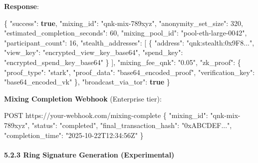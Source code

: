 \documentclass[
  11pt,
]{article}
\newenvironment{Shaded}{\begin{snugshade}}{\end{snugshade}}
\newcommand{\DataTypeTok}[1]{\textcolor[rgb]{0.13,0.29,0.53}{#1}}
\newcommand{\DecValTok}[1]{\textcolor[rgb]{0.00,0.00,0.81}{#1}}
\newcommand{\FunctionTok}[1]{\textcolor[rgb]{0.00,0.00,0.00}{#1}}
\newcommand{\KeywordTok}[1]{\textcolor[rgb]{0.13,0.29,0.53}{\textbf{#1}}}
\newcommand{\NormalTok}[1]{#1}
\newcommand{\OtherTok}[1]{\textcolor[rgb]{0.56,0.35,0.01}{#1}}
\newcommand{\StringTok}[1]{\textcolor[rgb]{0.31,0.60,0.02}{#1}}
\begin{document}
\textbf{Response}:

\begin{Shaded}
\begin{Highlighting}[]
\FunctionTok{\{}
  \DataTypeTok{"success"}\FunctionTok{:} \KeywordTok{true}\FunctionTok{,}
  \DataTypeTok{"mixing\_id"}\FunctionTok{:} \StringTok{"qnk{-}mix{-}789xyz"}\FunctionTok{,}
  \DataTypeTok{"anonymity\_set\_size"}\FunctionTok{:} \DecValTok{320}\FunctionTok{,}
  \DataTypeTok{"estimated\_completion\_seconds"}\FunctionTok{:} \DecValTok{60}\FunctionTok{,}
  \DataTypeTok{"mixing\_pool\_id"}\FunctionTok{:} \StringTok{"pool{-}eth{-}large{-}0042"}\FunctionTok{,}
  \DataTypeTok{"participant\_count"}\FunctionTok{:} \DecValTok{16}\FunctionTok{,}
  \DataTypeTok{"stealth\_addresses"}\FunctionTok{:} \OtherTok{[}
    \FunctionTok{\{}
      \DataTypeTok{"address"}\FunctionTok{:} \StringTok{"qnk:stealth:0x9F8..."}\FunctionTok{,}
      \DataTypeTok{"view\_key"}\FunctionTok{:} \StringTok{"encrypted\_view\_key\_base64"}\FunctionTok{,}
      \DataTypeTok{"spend\_key"}\FunctionTok{:} \StringTok{"encrypted\_spend\_key\_base64"}
    \FunctionTok{\}}
  \OtherTok{]}\FunctionTok{,}
  \DataTypeTok{"mixing\_fee\_qnk"}\FunctionTok{:} \StringTok{"0.05"}\FunctionTok{,}
  \DataTypeTok{"zk\_proof"}\FunctionTok{:} \FunctionTok{\{}
    \DataTypeTok{"proof\_type"}\FunctionTok{:} \StringTok{"stark"}\FunctionTok{,}
    \DataTypeTok{"proof\_data"}\FunctionTok{:} \StringTok{"base64\_encoded\_proof"}\FunctionTok{,}
    \DataTypeTok{"verification\_key"}\FunctionTok{:} \StringTok{"base64\_encoded\_vk"}
  \FunctionTok{\},}
  \DataTypeTok{"broadcast\_via\_tor"}\FunctionTok{:} \KeywordTok{true}
\FunctionTok{\}}
\end{Highlighting}
\end{Shaded}

\textbf{Mixing Completion Webhook} (Enterprise tier):

\begin{Shaded}
\begin{Highlighting}[]
\NormalTok{POST https://your{-}webhook.com/mixing{-}complete}
\NormalTok{\{}
\NormalTok{  "mixing\_id": "qnk{-}mix{-}789xyz",}
\NormalTok{  "status": "completed",}
\NormalTok{  "final\_transaction\_hash": "0xABCDEF...",}
\NormalTok{  "completion\_time": "2025{-}10{-}22T12:34:56Z"}
\NormalTok{\}}
\end{Highlighting}
\end{Shaded}

\hypertarget{ring-signature-generation-experimental}{%
\paragraph{5.2.3 Ring Signature Generation
(Experimental)}\label{ring-signature-generation-experimental}}
\end{document}
